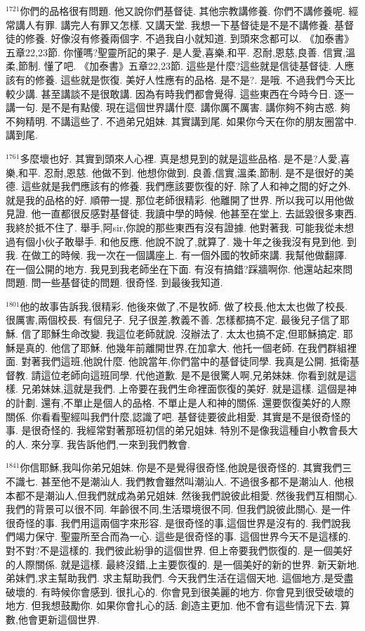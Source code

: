 \documentclass{book}
\begin{document}
$^{1721}$你們的品格很有問題.
他又說你們基督徒.
其他宗教講修養.
你們不講修養呢.
經常講人有罪.
講完人有罪又怎樣.
又講天堂.
我想一下基督徒是不是不講修養.
基督徒的修養.
好像沒有修養兩個字.
不過我自小就知道.
到頭來念都可以.
《加泰書》五章22,23節.
你懂嗎?聖靈所記的果子.
是人愛,喜樂,和平.
忍耐,恩慈,良善.
信實,溫柔,節制.
懂了吧.
《加泰書》五章22,23節.
這些是什麼?這些就是信徒基督徒.
人應該有的修養.
這些就是恢復.
美好人性應有的品格.
是不是?.
是哦.
不過我們今天比較少講.
甚至講談不是很敢講.
因為有時我們都會覺得.
這些東西在今時今日.
逐一講一句.
是不是有點傻.
現在這個世界講什麼.
講你厲不厲害.
講你夠不夠古惑.
夠不夠精明.
不講這些了.
不過弟兄姐妹.
其實講到尾.
如果你今天在你的朋友圈當中.
講到尾.

$^{1761}$多麼壞也好.
其實到頭來人心裡.
真是想見到的就是這些品格.
是不是?人愛,喜樂,和平.
忍耐,恩慈.
他做不到.
他想你做到.
良善,信實,溫柔,節制.
是不是很好的美德.
這些就是我們應該有的修養.
我們應該要恢復的好.
除了人和神之間的好之外.
就是我的品格的好.
順帶一提.
那位老師很精彩.
他離開了世界.
所以我可以用他做見證.
他一直都很反感對基督徒.
我讀中學的時候.
他甚至在堂上.
去詆毀很多東西.
我終於抵不住了.
舉手,阿sir,你說的那些東西有沒有證據.
他對著我.
可能我從未想過有個小伙子敢舉手.
和他反應.
他說不說了,就算了.
幾十年之後我沒有見到他.
到我.
在做工的時候.
我一次在一個講座上.
有一個外國的牧師來講.
我幫他做翻譯.
在一個公開的地方.
我見到我老師坐在下面.
有沒有搞錯?踩牆啊你.
他還站起來問問題.
問一些基督徒的問題.
很奇怪.
到最後我知道.

$^{1801}$他的故事告訴我,很精彩.
他後來做了,不是牧師.
做了校長,他太太也做了校長.
很厲害,兩個校長.
有個兒子.
兒子很差,教義不善.
怎樣都搞不定.
最後兒子信了耶穌.
信了耶穌生命改變.
我這位老師就說.
沒辦法了.
太太也搞不定,但耶穌搞定.
耶穌是真的.
他信了耶穌.
他幾年前離開世界,在加拿大.
他托一個老師.
在我們群組裡面.
對著我們這班,他說什麼.
他說當年,你們當中的基督徒同學.
我真是公開.
抵衛基督教.
請這位老師向這班同學.
代他道歉.
是不是很驚人啊,兄弟妹妹.
你看到就是這樣.
兄弟妹妹,這就是我們.
上帝要在我們生命裡面恢復的美好.
就是這樣.
這個是神的計劃.
還有,不單止是個人的品格.
不單止是人和神的關係.
還要恢復美好的人際關係.
你看看聖經叫我們什麼,認識了吧.
基督徒要彼此相愛.
其實是不是很奇怪的事.
是很奇怪的.
我經常對著那班初信的弟兄姐妹.
特別不是像我這種自小教會長大的人.
來分享.
我告訴他們,一來到我們教會.

$^{1841}$你信耶穌,我叫你弟兄姐妹.
你是不是覺得很奇怪,他說是很奇怪的.
其實我們三不識七.
甚至他不是潮汕人.
我們教會雖然叫潮汕人.
不過很多都不是潮汕人.
他根本都不是潮汕人,但我們就成為弟兄姐妹.
然後我們說彼此相愛.
然後我們互相關心.
我們的背景可以很不同.
年齡很不同,生活環境很不同.
但我們說彼此關心.
是一件很奇怪的事.
我們用這兩個字來形容.
是很奇怪的事,這個世界是沒有的.
我們說我們竭力保守.
聖靈所至合而為一心.
這些是很奇怪的事.
這個世界今天不是這樣的.
對不對?不是這樣的.
我們彼此紛爭的這個世界.
但上帝要我們恢復的.
是一個美好的人際關係.
就是這樣.
最終沒錯,上主要恢復的.
是一個美好的新的世界.
新天新地.
弟妹們,求主幫助我們.
求主幫助我們.
今天我們生活在這個天地.
這個地方,是受盡破壞的.
有時候你會感到.
很扎心的.
你會見到很美麗的地方.
你會見到很受破壞的地方.
但我想鼓勵你.
如果你會扎心的話.
創造主更加.
他不會有這些情況下去.
算數,他會更新這個世界.
\end{document}
